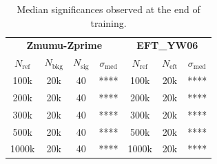 \begin{table}[H]
	\begin{tabular}{c c c c c c c}
		\toprule
		\multicolumn{4}{c}{\textbf{Zmumu-Zprime}}	&	\multicolumn{3}{c}{\textbf{EFT\_YW06}}	\\
		$N_\mathrm{ref}$	&	$N_\mathrm{bkg}$	&	$N_\mathrm{sig}$	&	$\sigma_\mathrm{med}$	&	$N_\mathrm{ref}$	&	$N_\mathrm{eft}$	&	$\sigma_\mathrm{med}$	\\
		\midrule
		100k	&	20k	&	40	&	****	&	100k	&	20k	&	****	\\
		200k	&	20k	&	40	&	****	&	200k	&	20k	&	****	\\
		300k	&	20k	&	40	&	****	&	300k	&	20k	&	****	\\
		500k	&	20k	&	40	&	****	&	500k	&	20k	&	****	\\
		1000k	&	20k	&	40	&	****	&	1000k	&	20k	&	****	\\
		\bottomrule		
	\end{tabular}
	\caption{Median significances observed at the end of training.}
	\label{tab:MED_SIG}
\end{table}





